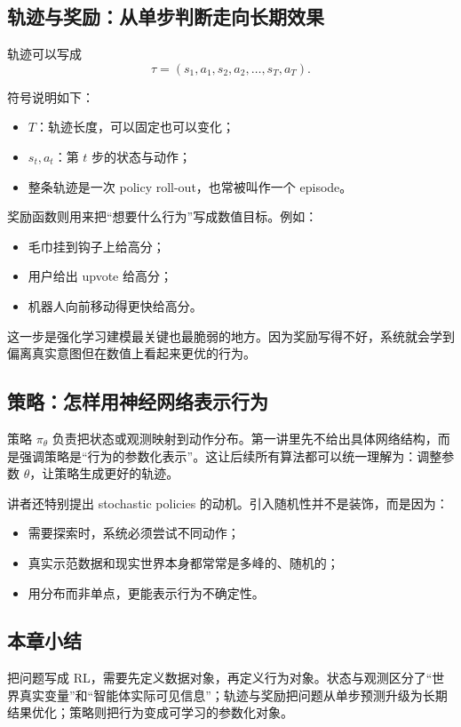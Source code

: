 \documentclass[a4paper]{article}
\begin{document}
\subsection{轨迹与奖励：从单步判断走向长期效果}

轨迹可以写成
\[
\tau=(s_1,a_1,s_2,a_2,\ldots,s_T,a_T).
\]

符号说明如下：
\begin{itemize}
\item \(T\)：轨迹长度，可以固定也可以变化；
\item \(s_t,a_t\)：第 \(t\) 步的状态与动作；
\item 整条轨迹是一次 policy roll-out，也常被叫作一个 episode。
\end{itemize}

奖励函数则用来把“想要什么行为”写成数值目标。例如：
\begin{itemize}
\item 毛巾挂到钩子上给高分；
\item 用户给出 upvote 给高分；
\item 机器人向前移动得更快给高分。
\end{itemize}

这一步是强化学习建模最关键也最脆弱的地方。因为奖励写得不好，系统就会学到偏离真实意图但在数值上看起来更优的行为。

\subsection{策略：怎样用神经网络表示行为}

策略 \(\pi_\theta\) 负责把状态或观测映射到动作分布。第一讲里先不给出具体网络结构，而是强调策略是“行为的参数化表示”。这让后续所有算法都可以统一理解为：调整参数 \(\theta\)，让策略生成更好的轨迹。

讲者还特别提出 stochastic policies 的动机。引入随机性并不是装饰，而是因为：
\begin{itemize}
\item 需要探索时，系统必须尝试不同动作；
\item 真实示范数据和现实世界本身都常常是多峰的、随机的；
\item 用分布而非单点，更能表示行为不确定性。
\end{itemize}

\subsection{本章小结}

把问题写成 RL，需要先定义数据对象，再定义行为对象。状态与观测区分了“世界真实变量”和“智能体实际可见信息”；轨迹与奖励把问题从单步预测升级为长期结果优化；策略则把行为变成可学习的参数化对象。
\end{document}
